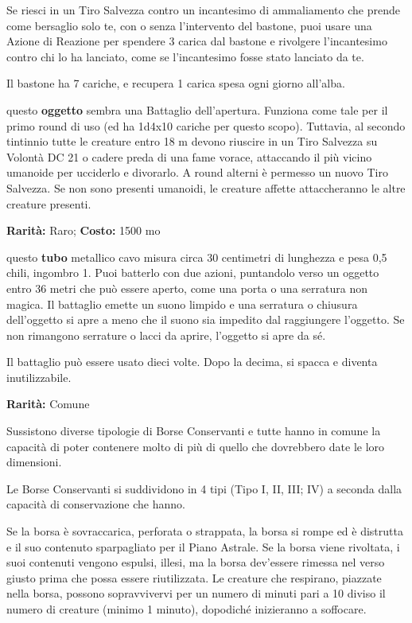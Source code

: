 \begin{multicols}{2}
Se riesci in un Tiro Salvezza contro un incantesimo di ammaliamento che prende come bersaglio solo te, con o senza l'intervento del bastone, puoi usare una Azione di Reazione per spendere 3 carica dal bastone e rivolgere l'incantesimo contro chi lo ha lanciato, come se l'incantesimo fosse stato lanciato da te.

Il bastone ha 7 cariche, e recupera 1 carica spesa ogni giorno all'alba.


questo \textbf{oggetto} sembra una Battaglio dell'apertura. Funziona come tale per il primo round di uso (ed ha 1d4x10 cariche per questo scopo). Tuttavia, al secondo tintinnio tutte le creature entro 18 m devono riuscire in un Tiro Salvezza su Volontà DC 21 o cadere preda di una fame vorace, attaccando il più vicino umanoide per ucciderlo e divorarlo. A round alterni è permesso un nuovo Tiro Salvezza. Se non sono presenti umanoidi, le creature affette attaccheranno le altre creature presenti.


\textbf{Rarità:} Raro; \textbf{Costo:} 1500 mo

questo \textbf{tubo} metallico cavo misura circa 30 centimetri di lunghezza e pesa 0,5 chili, ingombro 1. Puoi batterlo con due azioni, puntandolo verso un oggetto entro 36 metri che può essere aperto, come una porta o una serratura non magica. Il battaglio emette un suono limpido e una serratura o chiusura dell'oggetto si apre a meno che il suono sia impedito dal raggiungere l'oggetto. Se non rimangono serrature o lacci da aprire, l'oggetto si apre da sé.

Il battaglio può essere usato dieci volte. Dopo la decima, si spacca e diventa inutilizzabile.


\textbf{Rarità:} Comune

Sussistono diverse tipologie di Borse Conservanti e tutte hanno in comune la capacità di poter contenere molto di più di quello che dovrebbero date le loro dimensioni.

Le Borse Conservanti si suddividono in 4 tipi (Tipo I, II, III; IV) a seconda dalla capacità di conservazione che hanno.

Se la borsa è sovraccarica, perforata o strappata, la borsa si rompe ed è distrutta e il suo contenuto sparpagliato per il Piano Astrale. Se la borsa viene rivoltata, i suoi contenuti vengono espulsi, illesi, ma la borsa dev'essere rimessa nel verso giusto prima che possa essere riutilizzata. Le creature che respirano, piazzate nella borsa, possono sopravvivervi per un numero di minuti pari a 10 diviso il numero di creature (minimo 1 minuto), dopodiché inizieranno a soffocare.


\end{multicols}
